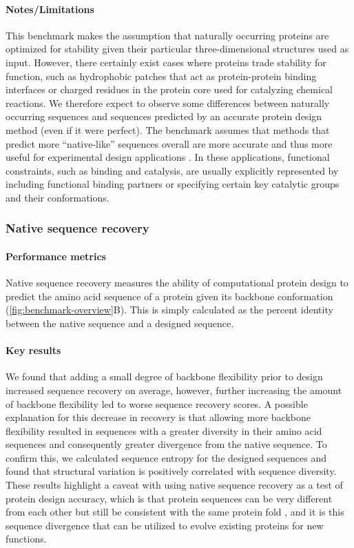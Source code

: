 \paragraph{Notes/Limitations}

This benchmark makes the assumption that naturally occurring proteins are optimized for stability given their particular three-dimensional structures used as input. However, there certainly exist cases where proteins trade stability for function, such as hydrophobic patches that act as protein-protein binding interfaces or charged residues in the protein core used for catalyzing chemical reactions. We therefore expect to observe some differences between naturally occurring sequences and sequences predicted by an accurate protein design method (even if it were perfect). The benchmark assumes that methods that predict more ``native-like'' sequences overall are more accurate and thus more useful for experimental design applications \cite{kuhlman_native_2000}. In these applications, functional constraints, such as binding and catalysis, are usually explicitly represented by including functional binding partners or specifying certain key catalytic groups and their conformations.

\subsubsection{Native sequence recovery}

\paragraph{Performance metrics}

Native sequence recovery \cite{kuhlman_native_2000} measures the ability of computational protein design to predict the amino acid sequence of a protein given its backbone conformation (\cref{fig:benchmark-overview}B). This is simply calculated as the percent identity between the native sequence and a designed sequence.

\paragraph{Key results}

We found that adding a small degree of backbone flexibility prior to design increased sequence recovery on average, however, further increasing the amount of backbone flexibility led to worse sequence recovery scores. A possible explanation for this decrease in recovery is that allowing more backbone flexibility resulted in sequences with a greater diversity in their amino acid sequences and consequently greater divergence from the native sequence. To confirm this, we calculated sequence entropy for the designed sequences and found that structural variation is positively correlated with sequence diversity. These results highlight a caveat with using native sequence recovery as a test of protein design accuracy, which is that protein sequences can be very different from each other but still be consistent with the same protein fold \cite{yona_within_2002}, and it is this sequence divergence that can be utilized to evolve existing proteins for new functions.

